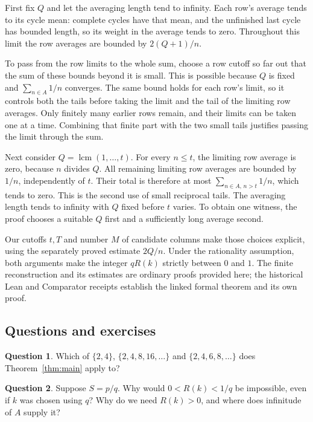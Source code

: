 \documentclass[10pt]{article}
\theoremstyle{plain}
\theoremstyle{definition}
\newtheorem{readercheck}{Question}
\theoremstyle{remark}
\begin{document}
First fix $Q$ and let the averaging length tend to infinity.
Each row's average tends to its cycle mean: complete cycles have that mean,
and the unfinished last cycle has bounded length, so its weight in the
average tends to zero. Throughout this limit the row averages are bounded
by $2(Q+1)/n$.

To pass from the row limits to the whole sum, choose a row cutoff so far
out that the sum of these bounds beyond it is small. This is possible
because $Q$ is fixed and $\sum_{n\in A}1/n$ converges.
The same bound holds for each row's limit, so it controls both the tails
before taking the limit and the tail of the limiting row averages.
Only finitely many earlier rows remain, and their limits can be taken one
at a time. Combining that finite part with the two small tails justifies
passing the limit through the sum.

Next consider $Q=\operatorname{lcm}(1,\dots,t)$. For every $n\le t$, the
limiting row average is zero, because $n$ divides $Q$. All remaining
limiting row averages are bounded by $1/n$, independently of $t$.
Their total is therefore at most $\sum_{n\in A,\,n>t}1/n$, which tends to
zero. This is the second use of small reciprocal tails.
The averaging length tends to infinity with $Q$ fixed before $t$ varies.
To obtain one witness, the proof chooses a suitable $Q$ first and a
sufficiently long average second.

Our cutoffs $t,T$ and number $M$ of candidate columns make those choices explicit,
using the separately proved estimate $2Q/n$. Under the rationality assumption, both arguments make the integer
$qR(k)$ strictly between $0$ and $1$.
The finite reconstruction and its estimates are ordinary proofs
provided here; the historical Lean and Comparator receipts establish the
linked formal theorem and its own proof.

\clearpage
\begin{samepage}
\section{Questions and exercises}\label{sec:exercises}

\begin{readercheck}\label{chk:hypotheses}
Which of $\{2,4\}$, $\{2,4,8,16,\dots\}$ and $\{2,4,6,8,\dots\}$ does
Theorem~\ref{thm:main} apply to?
\end{readercheck}
\end{samepage}

\begin{readercheck}\label{chk:positive}
Suppose $S=p/q$. Why would $0<R(k)<1/q$ be impossible, even if $k$
was chosen using $q$? Why do we need $R(k)>0$, and where does infinitude
of $A$ supply it?
\end{readercheck}
\end{document}
